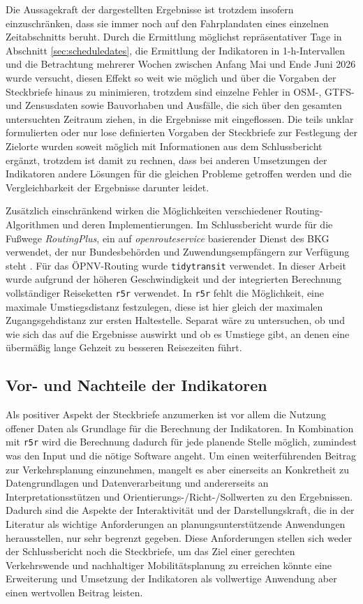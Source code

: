 \documentclass[11pt,pdftex,a4paper]{scrartcl}
\begin{document}
	Die Aussagekraft der dargestellten Ergebnisse ist trotzdem insofern einzuschränken, dass sie immer noch auf den Fahrplandaten eines einzelnen Zeitabschnitts beruht. Durch die Ermittlung möglichst repräsentativer Tage in Abschnitt \ref{sec:scheduledates}, die Ermittlung der Indikatoren in 1-h-Intervallen und die Betrachtung mehrerer Wochen zwischen Anfang Mai und Ende Juni 2026 wurde versucht, diesen Effekt so weit wie möglich und über die Vorgaben der Steckbriefe hinaus zu minimieren, trotzdem sind einzelne Fehler in OSM-, GTFS- und Zensusdaten sowie Bauvorhaben und Ausfälle, die sich über den gesamten untersuchten Zeitraum ziehen, in die Ergebnisse mit eingeflossen. Die teils unklar formulierten oder nur lose definierten Vorgaben der Steckbriefe zur Festlegung der Zielorte wurden soweit möglich mit Informationen aus dem Schlussbericht ergänzt, trotzdem ist damit zu rechnen, dass bei anderen Umsetzungen der Indikatoren andere Lösungen für die gleichen Probleme getroffen werden und die Vergleichbarkeit der Ergebnisse darunter leidet.
	
	Zusätzlich einschränkend wirken die Möglichkeiten verschiedener Routing-Algorithmen und deren Implementierungen. Im Schlussbericht wurde für die Fußwege \textit{RoutingPlus}, ein auf \textit{openrouteservice} \parencite{GIScienceOpenrouteservice2026} basierender Dienst des BKG verwendet, der nur Bundesbehörden und Zuwendungsempfängern zur Verfügung steht \parencite{BKGRoutingPlusDienst2026}. Für das ÖPNV-Routing wurde \texttt{tidytransit} \parencite{polettiTidytransitReadValidate2025} verwendet. In dieser Arbeit wurde aufgrund der höheren Geschwindigkeit und der integrierten Berechnung vollständiger Reiseketten \texttt{r5r} verwendet. In \texttt{r5r} fehlt die Möglichkeit, eine maximale Umstiegsdistanz festzulegen, diese ist hier gleich der maximalen Zugangsgehdistanz zur ersten Haltestelle. Separat wäre zu untersuchen, ob und wie sich das auf die Ergebnisse auswirkt und ob es Umstiege gibt, an denen eine übermäßig lange Gehzeit zu besseren Reisezeiten führt. 
	
	\subsection{Vor- und Nachteile der Indikatoren}
	Als positiver Aspekt der Steckbriefe anzumerken ist vor allem die Nutzung offener Daten als Grundlage für die Berechnung der Indikatoren. In Kombination mit \texttt{r5r} wird die Berechnung dadurch für jede planende Stelle möglich, zumindest was den Input und die nötige Software angeht. Um einen weiterführenden Beitrag zur Verkehrsplanung einzunehmen, mangelt es aber einerseits an Konkretheit zu Datengrundlagen und Datenverarbeitung und andererseits an Interpretationsstützen und Orientierungs-/Richt-/Sollwerten zu den Ergebnissen. Dadurch sind die Aspekte der Interaktivität und der Darstellungskraft, die in der Literatur als wichtige Anforderungen an planungsunterstützende Anwendungen herausstellen, nur sehr begrenzt gegeben. Diese Anforderungen stellen sich weder der Schlussbericht noch die Steckbriefe, um das Ziel einer gerechten Verkehrswende und nachhaltiger Mobilitätsplanung zu erreichen könnte eine Erweiterung und Umsetzung der Indikatoren als vollwertige Anwendung aber einen wertvollen Beitrag leisten.
	
\end{document}
